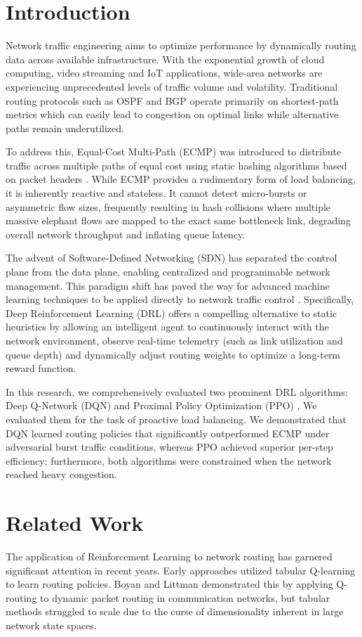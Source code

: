 \documentclass[10pt,twocolumn,letterpaper]{article}
\begin{document}
\section{Introduction}
Network traffic engineering aims to optimize performance by dynamically routing data across available infrastructure. With the exponential growth of cloud computing, video streaming and IoT applications, wide-area networks are experiencing unprecedented levels of traffic volume and volatility. Traditional routing protocols such as OSPF and BGP operate primarily on shortest-path metrics which can easily lead to congestion on optimal links while alternative paths remain underutilized.

To address this, Equal-Cost Multi-Path (ECMP) was introduced to distribute traffic across multiple paths of equal cost using static hashing algorithms based on packet headers \cite{hopps2000analysis}. While ECMP provides a rudimentary form of load balancing, it is inherently reactive and stateless. It cannot detect micro-bursts or asymmetric flow sizes, frequently resulting in hash collisions where multiple massive elephant flows are mapped to the exact same bottleneck link, degrading overall network throughput and inflating queue latency.

The advent of Software-Defined Networking (SDN) has separated the control plane from the data plane, enabling centralized and programmable network management. This paradigm shift has paved the way for advanced machine learning techniques to be applied directly to network traffic control \cite{pei2024enabling}. Specifically, Deep Reinforcement Learning (DRL) offers a compelling alternative to static heuristics by allowing an intelligent agent to continuously interact with the network environment, observe real-time telemetry (such as link utilization and queue depth) and dynamically adjust routing weights to optimize a long-term reward function.

In this research, we comprehensively evaluated two prominent DRL algorithms: Deep Q-Network (DQN) \cite{mnih2015human} and Proximal Policy Optimization (PPO) \cite{schulman2017proximal}. We evaluated them for the task of proactive load balancing. We demonstrated that DQN learned routing policies that significantly outperformed ECMP under adversarial burst traffic conditions, whereas PPO achieved superior per-step efficiency; furthermore, both algorithms were constrained when the network reached heavy congestion.

\section{Related Work}
The application of Reinforcement Learning to network routing has garnered significant attention in recent years. Early approaches utilized tabular Q-learning \cite{watkins1992q} to learn routing policies. Boyan and Littman \cite{boyan1994packet} demonstrated this by applying Q-routing to dynamic packet routing in communication networks, but tabular methods struggled to scale due to the curse of dimensionality inherent in large network state spaces.
\end{document}
